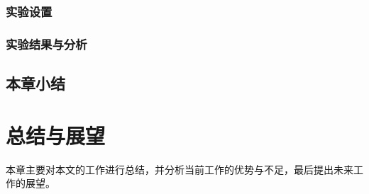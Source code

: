 \documentclass[algorithmlist, AutoFakeBold, AutoFakeSlant, figurelist, tablelist, nomlist, masters]{seuthesix}
\begin{document}
\subsection{实验设置}


\subsection{实验结果与分析}





\section{本章小结}



\chapter{总结与展望}
本章主要对本文的工作进行总结，并分析当前工作的优势与不足，最后提出未来工作的展望。
\end{document}
